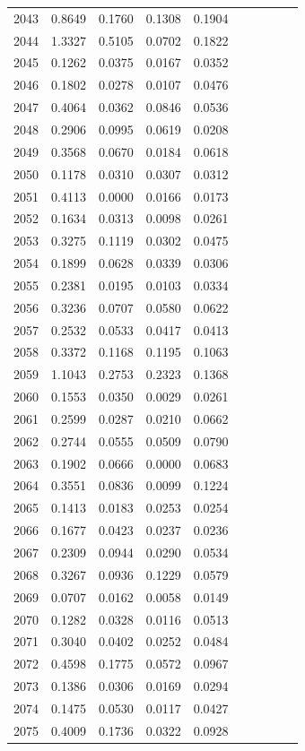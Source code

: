\begin{table}
\begin{tabular}{cccccccccc}
2043& 0.8649& 0.1760& 0.1308& 0.1904\\ 
2044& 1.3327& 0.5105& 0.0702& 0.1822\\ 
2045& 0.1262& 0.0375& 0.0167& 0.0352\\ 
2046& 0.1802& 0.0278& 0.0107& 0.0476\\ 
2047& 0.4064& 0.0362& 0.0846& 0.0536\\ 
2048& 0.2906& 0.0995& 0.0619& 0.0208\\ 
2049& 0.3568& 0.0670& 0.0184& 0.0618\\ 
2050& 0.1178& 0.0310& 0.0307& 0.0312\\ 
2051& 0.4113& 0.0000& 0.0166& 0.0173\\ 
2052& 0.1634& 0.0313& 0.0098& 0.0261\\ 
2053& 0.3275& 0.1119& 0.0302& 0.0475\\ 
2054& 0.1899& 0.0628& 0.0339& 0.0306\\ 
2055& 0.2381& 0.0195& 0.0103& 0.0334\\ 
2056& 0.3236& 0.0707& 0.0580& 0.0622\\ 
2057& 0.2532& 0.0533& 0.0417& 0.0413\\ 
2058& 0.3372& 0.1168& 0.1195& 0.1063\\ 
2059& 1.1043& 0.2753& 0.2323& 0.1368\\ 
2060& 0.1553& 0.0350& 0.0029& 0.0261\\ 
2061& 0.2599& 0.0287& 0.0210& 0.0662\\ 
2062& 0.2744& 0.0555& 0.0509& 0.0790\\ 
2063& 0.1902& 0.0666& 0.0000& 0.0683\\ 
2064& 0.3551& 0.0836& 0.0099& 0.1224\\ 
2065& 0.1413& 0.0183& 0.0253& 0.0254\\ 
2066& 0.1677& 0.0423& 0.0237& 0.0236\\ 
2067& 0.2309& 0.0944& 0.0290& 0.0534\\ 
2068& 0.3267& 0.0936& 0.1229& 0.0579\\ 
2069& 0.0707& 0.0162& 0.0058& 0.0149\\ 
2070& 0.1282& 0.0328& 0.0116& 0.0513\\ 
2071& 0.3040& 0.0402& 0.0252& 0.0484\\ 
2072& 0.4598& 0.1775& 0.0572& 0.0967\\ 
2073& 0.1386& 0.0306& 0.0169& 0.0294\\ 
2074& 0.1475& 0.0530& 0.0117& 0.0427\\ 
2075& 0.4009& 0.1736& 0.0322& 0.0928\\ 

\end{tabular}
\end{table}
